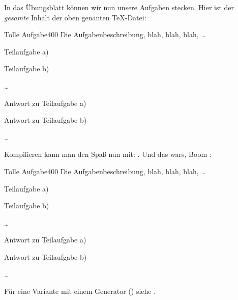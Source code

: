 In das Übungsblatt können wir nun unsere Aufgaben stecken. Hier ist der \emph{gesamte} Inhalt der oben genanten \TeX-Datei:
\begin{latex}
\begin{aufgabe}{Tolle Aufgabe}{400} %
    Die Aufgabenbeschreibung, blah, blah, blah, \ldots
    \begin{aufgaben}
        \item Teilaufgabe a)
        \item Teilaufgabe b)
        \item \ldots
    \end{aufgaben}
\vSplitter
    \begin{aufgaben}
        \item Antwort zu Teilaufgabe a)
        \item Antwort zu Teilaufgabe b)
        \item \ldots
    \end{aufgaben}
\end{aufgabe}

\end{latex}

Kompilieren kann man den Spaß nun mit: . Und das wars, Boom \Smiley:\\

\begin{aufgabe}{Tolle Aufgabe}{400} %
    Die Aufgabenbeschreibung, blah, blah, blah, \ldots
    \begin{aufgaben}
        \item Teilaufgabe a)
        \item Teilaufgabe b)
        \item \ldots
    \end{aufgaben}
\vSplitter
    \begin{aufgaben}
        \item Antwort zu Teilaufgabe a)
        \item Antwort zu Teilaufgabe b)
        \item \ldots
    \end{aufgaben}
\end{aufgabe}

Für eine Variante mit einem Generator (\Jake[]) siehe .
